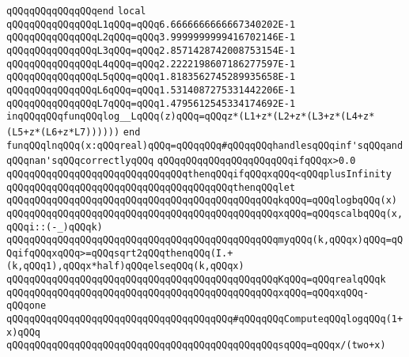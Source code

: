 \verb|qQQqqQQqqQQqqQQqend|\newline
\newline
\verb|local|\newline
\verb|qQQqqQQqqQQqqQQqL1qQQq=qQQq6.6666666666667340202E-1|\newline
\verb|qQQqqQQqqQQqqQQqL2qQQq=qQQq3.9999999999416702146E-1|\newline
\verb|qQQqqQQqqQQqqQQqL3qQQq=qQQq2.8571428742008753154E-1|\newline
\verb|qQQqqQQqqQQqqQQqL4qQQq=qQQq2.2222198607186277597E-1|\newline
\verb|qQQqqQQqqQQqqQQqL5qQQq=qQQq1.8183562745289935658E-1|\newline
\verb|qQQqqQQqqQQqqQQqL6qQQq=qQQq1.5314087275331442206E-1|\newline
\verb|qQQqqQQqqQQqqQQqL7qQQq=qQQq1.4795612545334174692E-1|\newline
\verb|inqQQqqQQqfunqQQqlog__LqQQq(z)qQQq=qQQqz*(L1+z*(L2+z*(L3+z*(L4+z*(L5+z*(L6+z*L7))))))|\newline
\verb|end|\newline
\newline
\verb|funqQQqlnqQQq(x:qQQqreal)qQQq=qQQqqQQq#qQQqqQQqhandlesqQQqinf'sqQQqandqQQqnan'sqQQqcorrectlyqQQq|\newline
\verb|qQQqqQQqqQQqqQQqqQQqqQQqifqQQqx>0.0|\newline
\verb|qQQqqQQqqQQqqQQqqQQqqQQqqQQqqQQqthenqQQqifqQQqxqQQq<qQQqplusInfinity|\newline
\verb|qQQqqQQqqQQqqQQqqQQqqQQqqQQqqQQqqQQqqQQqthenqQQqlet|\newline
\verb|qQQqqQQqqQQqqQQqqQQqqQQqqQQqqQQqqQQqqQQqqQQqqQQqkqQQq=qQQqlogbqQQq(x)|\newline
\verb|qQQqqQQqqQQqqQQqqQQqqQQqqQQqqQQqqQQqqQQqqQQqqQQqxqQQq=qQQqscalbqQQq(x,qQQqi::(-_)qQQqk)|\newline
\verb|qQQqqQQqqQQqqQQqqQQqqQQqqQQqqQQqqQQqqQQqqQQqqQQqmyqQQq(k,qQQqx)qQQq=qQQqifqQQqxqQQq>=qQQqsqrt2qQQqthenqQQq(I.+(k,qQQq1),qQQqx*half)qQQqelseqQQq(k,qQQqx)|\newline
\verb|qQQqqQQqqQQqqQQqqQQqqQQqqQQqqQQqqQQqqQQqqQQqqQQqKqQQq=qQQqrealqQQqk|\newline
\verb|qQQqqQQqqQQqqQQqqQQqqQQqqQQqqQQqqQQqqQQqqQQqqQQqxqQQq=qQQqxqQQq-qQQqone|\newline
\verb|qQQqqQQqqQQqqQQqqQQqqQQqqQQqqQQqqQQqqQQq#qQQqqQQqComputeqQQqlogqQQq(1+x)qQQq|\newline
\verb|qQQqqQQqqQQqqQQqqQQqqQQqqQQqqQQqqQQqqQQqqQQqqQQqsqQQq=qQQqx/(two+x)|\newline
